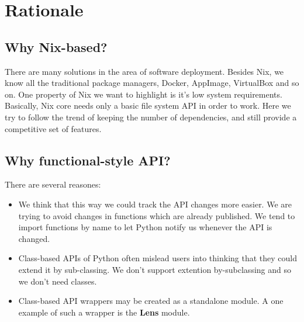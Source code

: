\section{Rationale}

\subsection{Why Nix-based?}

There are many solutions in the area of software deployment.
Besides Nix, we know all the traditional package managers, Docker, AppImage,
VirtualBox and so on. One property of Nix we want to highlight is it's low
system requirements. Basically, Nix core needs only a basic file system API
in order to work. Here we try to follow the trend of keeping the number of
dependencies, and still provide a competitive set of features.

\subsection{Why functional-style API?}

There are several reasones:
\begin{itemize}
  \item We think that this way we could track the API changes more easier. We
    are trying to avoid changes in functions which are already published. We
    tend to import functions by name to let Python notify us whenever the API is
    changed.
  \item Class-based APIs of Python often mislead users into thinking that they
    could extend it by sub-classing. We don't support extention by-subclassing
    and so we don't need classes.
  \item Class-based API wrappers may be created as a standalone module. A one
    example of such a wrapper is the \textbf{Lens} module.
\end{itemize}

